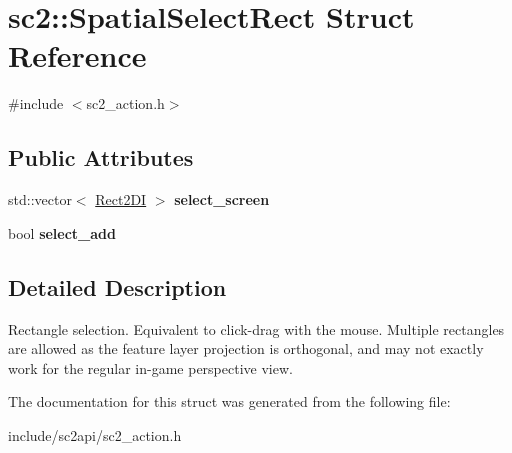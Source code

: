 \hypertarget{structsc2_1_1_spatial_select_rect}{}\section{sc2\+:\+:Spatial\+Select\+Rect Struct Reference}
\label{structsc2_1_1_spatial_select_rect}


{\ttfamily \#include $<$sc2\+\_\+action.\+h$>$}

\subsection*{Public Attributes}
\begin{DoxyCompactItemize}
\item 
\mbox{\label{structsc2_1_1_spatial_select_rect_a4df6223c944de6e62d4577a2c8c86665}} 
std\+::vector$<$ \hyperlink{structsc2_1_1_rect2_d_i}{Rect2\+DI} $>$ {\bfseries select\+\_\+screen}
\item 
\mbox{\label{structsc2_1_1_spatial_select_rect_a761f039602b2de9ffa6a284983c815b5}} 
bool {\bfseries select\+\_\+add}
\end{DoxyCompactItemize}


\subsection{Detailed Description}
Rectangle selection. Equivalent to click-\/drag with the mouse. Multiple rectangles are allowed as the feature layer projection is orthogonal, and may not exactly work for the regular in-\/game perspective view. 

The documentation for this struct was generated from the following file\+:\begin{DoxyCompactItemize}
\item 
include/sc2api/sc2\+\_\+action.\+h\end{DoxyCompactItemize}

